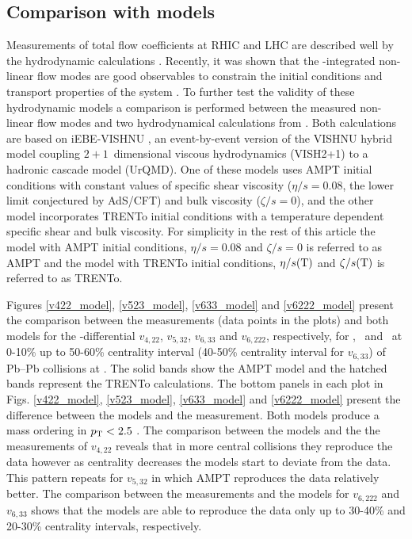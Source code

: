 \newpage
\subsection{Comparison with models}
\label{SubSec:hydro}

Measurements of total flow coefficients at RHIC and LHC are described well by the hydrodynamic calculations \cite{Xu:2016hmp, McDonald:2016vlt, Zhao:2017yhj}. Recently, it was shown that the \pT-integrated non-linear flow modes are good observables to constrain the initial conditions and transport properties of the system \cite{Acharya:2017zfg}. To further test the validity of these hydrodynamic models a comparison is performed between the measured non-linear flow modes and two hydrodynamical calculations from \cite{Zhao:2017yhj}.  Both calculations are based on iEBE-VISHNU \cite{Shen:2014vra}, an event-by-event version of the VISHNU hybrid model \cite{Song:2010aq} coupling $2+1$~dimensional viscous hydrodynamics (VISH2+1) \cite{Song:2007fn} to a hadronic cascade model (UrQMD). One of these models uses AMPT \cite{Lin:2004en} initial conditions with constant values of specific shear viscosity ($\eta/s =0.08$, the lower limit conjectured by AdS/CFT) and bulk viscosity ($\zeta/s = 0$), and the other model incorporates TRENTo \cite{Moreland:2014oya} initial conditions with a temperature dependent specific shear and bulk viscosity. For simplicity in the rest of this article the model with AMPT initial conditions, $\eta/s =0.08$ and $\zeta/s =0$ is referred to as AMPT and the model with TRENTo initial conditions, $\eta/s(\rm{T})$ and $\zeta/s(\rm{T})$ is referred to as TRENTo. 

Figures \ref{v422_model}, \ref{v523_model}, \ref{v633_model} and \ref{v6222_model} present the comparison between the measurements (data points in the plots) and both models for the \pT-differential $v_{4,22}$, $v_{5,32}$, $v_{6,33}$ and $v_{6,222}$, respectively, for \pion, \kaon~and \proton~at 0-10\% up to 50-60\% centrality interval (40-50\% centrality interval for $v_{6,33}$) of Pb--Pb collisions at \sNN. The solid bands show the AMPT model and the hatched bands represent the TRENTo calculations. The bottom panels in each plot in Figs. \ref{v422_model}, \ref{v523_model}, \ref{v633_model} and \ref{v6222_model} present the difference between the models and the measurement. Both models produce a mass ordering in $p_{\rm{T}}<2.5$ \GeV. The comparison between the models and the the measurements of $v_{4,22}$ reveals that in more central collisions they reproduce the data however as centrality decreases the models start to deviate from the data. This pattern repeats for $v_{5,32}$ in which AMPT reproduces the data relatively better. The comparison between the measurements and the models  for $v_{6,222}$ and $v_{6,33}$ shows that the models are able to reproduce the data only up to 30-40\% and 20-30\% centrality intervals, respectively. 


